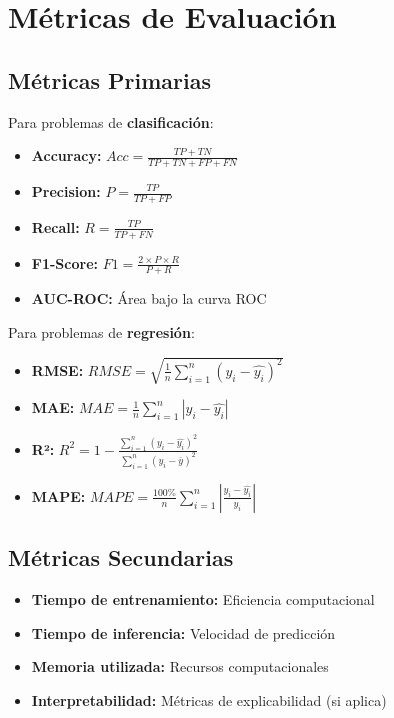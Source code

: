 \section{Métricas de Evaluación}

\subsection{Métricas Primarias}

Para problemas de \textbf{clasificación}:
\begin{itemize}
    \item \textbf{Accuracy:} $Acc = \frac{TP + TN}{TP + TN + FP + FN}$
    \item \textbf{Precision:} $P = \frac{TP}{TP + FP}$
    \item \textbf{Recall:} $R = \frac{TP}{TP + FN}$
    \item \textbf{F1-Score:} $F1 = \frac{2 \times P \times R}{P + R}$
    \item \textbf{AUC-ROC:} Área bajo la curva ROC
\end{itemize}

Para problemas de \textbf{regresión}:
\begin{itemize}
    \item \textbf{RMSE:} $RMSE = \sqrt{\frac{1}{n}\sum_{i=1}^{n}(y_i - \hat{y_i})^2}$
    \item \textbf{MAE:} $MAE = \frac{1}{n}\sum_{i=1}^{n}|y_i - \hat{y_i}|$
    \item \textbf{R²:} $R^2 = 1 - \frac{\sum_{i=1}^{n}(y_i - \hat{y_i})^2}{\sum_{i=1}^{n}(y_i - \bar{y})^2}$
    \item \textbf{MAPE:} $MAPE = \frac{100\%}{n}\sum_{i=1}^{n}\left|\frac{y_i - \hat{y_i}}{y_i}\right|$
\end{itemize}

\subsection{Métricas Secundarias}

\begin{itemize}
    \item \textbf{Tiempo de entrenamiento:} Eficiencia computacional
    \item \textbf{Tiempo de inferencia:} Velocidad de predicción
    \item \textbf{Memoria utilizada:} Recursos computacionales
    \item \textbf{Interpretabilidad:} Métricas de explicabilidad (si aplica)
\end{itemize}


